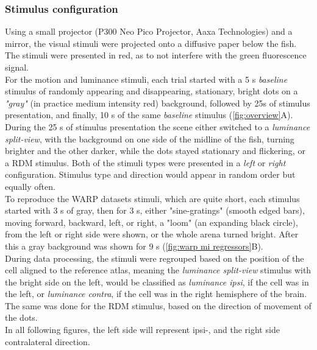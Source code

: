 \documentclass[12pt, a4paper, oneside]{article}
\begin{document}
\subsubsection{Stimulus configuration}
\label{sec:stimuli}
Using a small projector (P300 Neo Pico Projector, Aaxa Technologies) and a mirror, the visual stimuli were projected onto a diffusive paper below the fish. The stimuli were presented in red, as to not interfere with the green fluorescence signal.\\
For the motion and luminance stimuli, each trial started with a 5 s \textit{baseline} stimulus of randomly appearing and disappearing, stationary, bright dots on a \textit{"gray"} (in practice medium intensity red) background, followed by 25s of stimulus presentation, and finally, 10 s of the same \textit{baseline} stimulus (\autoref{fig:overview}A).\\
During the 25 s of stimulus presentation the scene either switched to a \textit{luminance split-view}, with the background on one side of the midline of the fish, turning brighter and the other darker, while the dots stayed stationary and flickering, or a RDM stimulus. Both of the stimuli types were presented in a \textit{left} or \textit{right} configuration. Stimulus type and direction would appear in random order but equally often.\\
To reproduce the WARP datasets stimuli, which are quite short, each stimulus started with 3 s of gray, then for 3 s, either "sine-gratings" (smooth edged bars), moving forward, backward, left, or right, a "loom" (an expanding black circle), from the left or right side were shown, or the whole arena turned bright. After this a gray background was shown for 9 s (\autoref{fig:warp mi regressors}B).\\
During data processing, the stimuli were regrouped based on the position of the cell aligned to the reference atlas, meaning the \textit{luminance split-view} stimulus with the bright side on the left, would be classified as \textit{luminance ipsi}, if the cell was in the left, or \textit{luminance contra}, if the cell was in the right hemisphere of the brain. The same was done for the RDM stimulus, based on the direction of movement of the dots.\\
In all following figures, the left side will represent ipsi-, and the right side contralateral direction.
\end{document}
